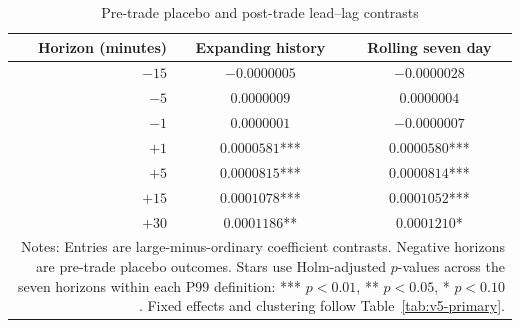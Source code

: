 \begin{table}[htbp]
\centering
\caption{Pre-trade placebo and post-trade lead--lag contrasts}
\label{tab:v5-leadlag}
\small
\begin{tabular}{rcc}
\toprule
Horizon (minutes) & Expanding history & Rolling seven day \\
\midrule
$-15$ & $-0.0000005$ & $-0.0000028$ \\
$-5$  & $ 0.0000009$ & $ 0.0000004$ \\
$-1$  & $ 0.0000001$ & $-0.0000007$ \\
$+1$  & $ 0.0000581$*** & $ 0.0000580$*** \\
$+5$  & $ 0.0000815$*** & $ 0.0000814$*** \\
$+15$ & $ 0.0001078$*** & $ 0.0001052$*** \\
$+30$ & $ 0.0001186$** & $ 0.0001210$* \\
\bottomrule
\multicolumn{3}{p{0.92\textwidth}}{\footnotesize Notes: Entries are large-minus-ordinary coefficient contrasts. Negative horizons are pre-trade placebo outcomes. Stars use Holm-adjusted $p$-values across the seven horizons within each P99 definition: *** $p<0.01$, ** $p<0.05$, * $p<0.10$. Fixed effects and clustering follow Table~\ref{tab:v5-primary}.}
\end{tabular}
\end{table}
